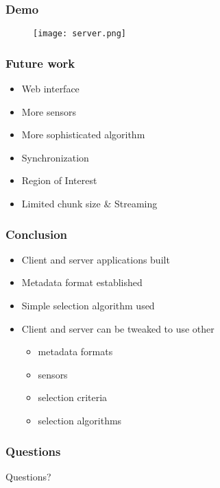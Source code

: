 \begin{frame}
	\frametitle{Demo}
		\begin{figure}[!t]
			\centering
			\texttt{[image: server.png]}
			\label{fig:server}
		\end{figure}
\end{frame}

\begin{frame}
	\frametitle{Future work}
	\begin{itemize}
		\item Web interface
		\item More sensors
		\item More sophisticated algorithm
		\item Synchronization
		\item Region of Interest
		\item Limited chunk size \& Streaming
	\end{itemize}
\end{frame}

\begin{frame}
	\frametitle{Conclusion}
	\begin{itemize}
		\item Client and server applications built
		\item Metadata format established
		\item Simple selection algorithm used
		\item Client and server can be tweaked to use other
		\begin{itemize}
			\item metadata formats
			\item sensors
			\item selection criteria
			\item selection algorithms
		\end{itemize}
	\end{itemize}
\end{frame}

\begin{frame}
	\frametitle{Questions}
	\centering
	\Huge Questions?
\end{frame}